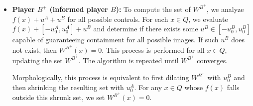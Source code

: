 \begin{itemize}
\item {\bf Player $B^+$ (informed player $B$):}
To compute the set of $W^{B^+}$, we analyze $f(x)+u^A+u^B$ for all possible controls. For each $x \in Q$, we evaluate $f(x)+[-u_0^A,u_0^A]+u^B$ and determine if there exists some $u^B \in [-u_0^B,u_0^B]$ capable of guaranteeing containment for all possible images. If such $u^B$ does not exist, then $W^{B^+}(x)=0$. This process is performed for all $x \in Q$, updating the set $W^{B^+}$. The algorithm is repeated until $W^{B^+}$ converges.

Morphologically, this process is equivalent to first dilating $W^{B^+}$ with $u_0^B$ and then shrinking the resulting set with $u_0^A$. For any $x \in Q$ whose $f(x)$ falls outside this shrunk set, we set $W^{B^+}(x)=0$.
\end{itemize}



